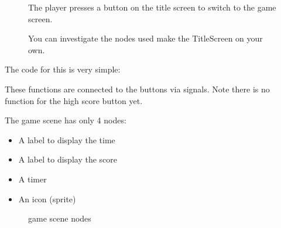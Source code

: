 \documentclass[a4paper,12pt,english]{sphinxmanual}
\begin{document}
\begin{figure}[htbp]
\centering
\capstart

\noindent{}
\caption{The player presses a button on the title screen to switch to the game
screen.}\label{\detokenize{tutorial:id1}}\end{figure}

\begin{figure}[htbp]
\centering
\capstart

\noindent{}
\caption{You can investigate the nodes used make the TitleScreen on your own.}\label{\detokenize{tutorial:id2}}\end{figure}

\sphinxAtStartPar
The code for this is very simple:

\begin{sphinxVerbatim}[commandchars=\\\{\}]
 

 
\end{sphinxVerbatim}

\sphinxAtStartPar
These functions are connected to the buttons via signals. Note there is
no function for the high score button yet.

\sphinxAtStartPar
The game scene has only 4 nodes:
\begin{itemize}
\item {} 
\sphinxAtStartPar
A label to display the time

\item {} 
\sphinxAtStartPar
A label to display the score

\item {} 
\sphinxAtStartPar
A timer

\item {} 
\sphinxAtStartPar
An icon (sprite)

\end{itemize}

\begin{figure}[htbp]
\centering
\capstart

\noindent{}
\caption{game scene nodes}\label{\detokenize{tutorial:id3}}\end{figure}
\end{document}
